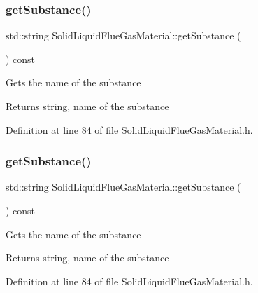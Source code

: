 \subsubsection{\texorpdfstring{get\+Substance()}{getSubstance()}\hspace{0.1cm}{\footnotesize\ttfamily [2/3]}}
{\footnotesize\ttfamily std\+::string Solid\+Liquid\+Flue\+Gas\+Material\+::get\+Substance (\begin{DoxyParamCaption}{ }\end{DoxyParamCaption}) const\hspace{0.3cm}{\ttfamily [inline]}}

Gets the name of the substance \begin{DoxyReturn}{Returns}
string, name of the substance 
\end{DoxyReturn}


Definition at line 84 of file Solid\+Liquid\+Flue\+Gas\+Material.\+h.

\mbox{\label{class_solid_liquid_flue_gas_material_a6e07a23fb05c15c7e5dba39334988de8}} 
\subsubsection{\texorpdfstring{get\+Substance()}{getSubstance()}\hspace{0.1cm}{\footnotesize\ttfamily [3/3]}}
{\footnotesize\ttfamily std\+::string Solid\+Liquid\+Flue\+Gas\+Material\+::get\+Substance (\begin{DoxyParamCaption}{ }\end{DoxyParamCaption}) const\hspace{0.3cm}{\ttfamily [inline]}}

Gets the name of the substance \begin{DoxyReturn}{Returns}
string, name of the substance 
\end{DoxyReturn}


Definition at line 84 of file Solid\+Liquid\+Flue\+Gas\+Material.\+h.

\mbox{\label{class_solid_liquid_flue_gas_material_abe35d8ff283bfa5aadcf00f9906025ae}} 
